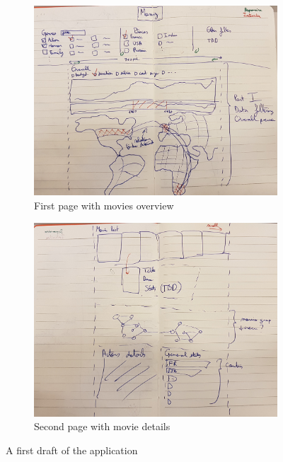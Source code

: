 \documentclass[a4paper,10pt]{article}
\begin{document}
\begin{figure}[ht]
 \begin{subfigure}{.5\textwidth}
  \centering
  \includegraphics[height=0.78\linewidth]{images/drafts/overview-1.jpg}
  \caption{First page with movies overview}
 \end{subfigure}\hfill
 \begin{subfigure}{.5\textwidth}
  \centering
  \includegraphics[height=0.78\linewidth]{images/drafts/overview-2.jpg}
  \caption{Second page with movie details}
 \end{subfigure}
 \caption{A first draft of the application} \label{fig:draft-overview}
\end{figure}
\end{document}
